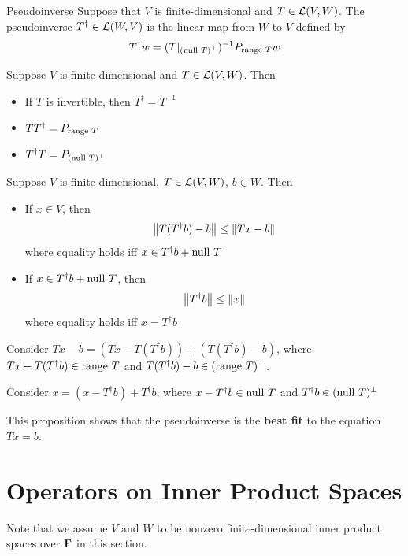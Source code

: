 \documentclass[12pt,a4paper]{article}
\begin{document}
    \begin{defi}{Pseudoinverse}
        Suppose that $V$ is finite-dimensional and $T\in\mathcal{L}(V,W)$. The pseudoinverse $T^\dagger\in\mathcal{L}(W,V)$ is the linear map from $W$ to $V$ defined by 
        $$
        T^\dagger w=(T|_{(\operatorname{null\,} T)^{\perp}})^{-1}P_{\operatorname{range\,} T}w
        $$
    \end{defi}
    \begin{prop}
        Suppose $V$ is finite-dimensional and $T\in\mathcal{L}(V,W)$. Then
        \begin{itemize}
            \item If $T$ is invertible, then $T^\dagger=T^{-1}$
            \item $TT^\dagger=P_{\operatorname{range\,} T}$
            \item $T^\dagger T=P_{(\operatorname{null\,} T)^{\perp}}$
        \end{itemize}
    \end{prop}
    \hfill

    \begin{prop}
        Suppose $V$ is finite-dimensional, $T\in\mathcal{L}(V,W)$, $b\in W$. Then
        \begin{itemize}
            \item If $x\in V$, then
            $$
            \left\lVert T(T^\dagger b)-b\right\rVert\leq\left\lVert Tx-b\right\rVert
            $$
            where equality holds iff $x\in T^\dagger b+\operatorname{null\,} T$
            \item If $x\in T^\dagger b+\operatorname{null\,} T$, then
            $$
            \left\lVert T^\dagger b\right\rVert\leq\left\lVert x\right\rVert
            $$
            where equality holds iff $x=T^\dagger b$
        \end{itemize}
    \end{prop}
    \begin{remark}
        Consider $Tx-b=(Tx-T(T^\dagger b))+(T(T^\dagger b)-b)$, where $Tx-T(T^\dagger b)\in\operatorname{range\,} T$ and $T(T^\dagger b)-b\in(\operatorname{range\,} T)^{\perp}$.

        Consider $x=(x-T^\dagger b)+T^\dagger b$, where $x-T^\dagger b\in\operatorname{null\,} T$ and $T^\dagger b\in(\operatorname{null\,} T)^{\perp}$
    \end{remark}
    \begin{remark}
        This proposition shows that the pseudoinverse is the \textbf{best fit} to the equation $Tx=b$.
    \end{remark}
    \hfill

    \section{Operators on Inner Product Spaces}%
    Note that we assume $V$ and $W$ to be nonzero finite-dimensional inner product spaces over $\mathbf{F}$ in this section.
\end{document}

